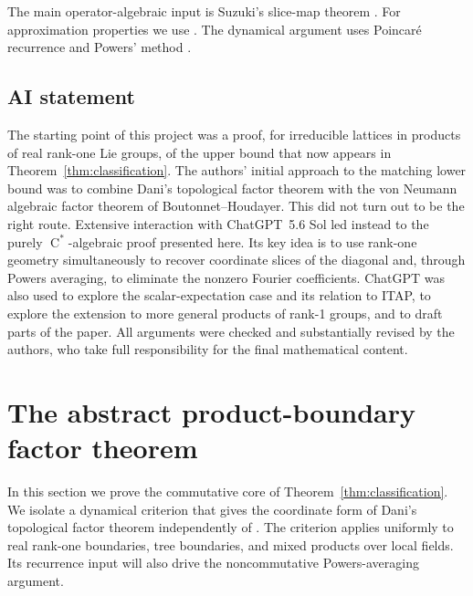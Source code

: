 \documentclass[11pt]{amsart}
\numberwithin{equation}{section}
\newcommand{\rC}{\operatorname{C}}
\theoremstyle{definition}
\begin{document}
	The main operator-algebraic input is Suzuki's slice-map theorem
	\cite[Proposition~3.4]{Su17}. For approximation properties we use
	\cite{CH89,HK94,Sz91}. The dynamical argument uses Poincar\'e recurrence and
	Powers' method \cite{Po75}.

	\subsection*{AI statement}
	The starting point of this project was a proof, for irreducible lattices in products of real rank-one Lie groups, of the upper bound that now appears in Theorem~\ref{thm:classification}. The authors' initial approach to the matching lower bound was to combine Dani's topological factor theorem with the von Neumann algebraic factor theorem of Boutonnet--Houdayer. This did not turn out to be the right route. Extensive interaction with ChatGPT~5.6 Sol led instead to the purely \(\rC^*\)-algebraic proof presented here. Its key idea is to use rank-one geometry simultaneously to recover coordinate slices of the diagonal and, through Powers averaging, to eliminate the nonzero Fourier coefficients. ChatGPT was also used to explore the scalar-expectation case and its relation to {\rm ITAP}, to explore the extension to more general products of rank-1 groups, and to draft parts of the paper. All arguments were checked and substantially revised by the authors, who take full responsibility for the final mathematical content.
	
	\tableofcontents
	
	\section{The abstract product-boundary factor theorem}
	\label{sec:abstract-coordinate-factor}
	
	In this section we prove the commutative core of Theorem~\ref{thm:classification}.  We isolate a
	dynamical criterion that gives the coordinate form of Dani's topological factor
	theorem independently of \cite{Da84}.  The criterion applies uniformly to real
	rank-one boundaries, tree boundaries, and mixed products over local fields.  Its
	recurrence input will also drive the noncommutative Powers-averaging argument.
	
\end{document}
